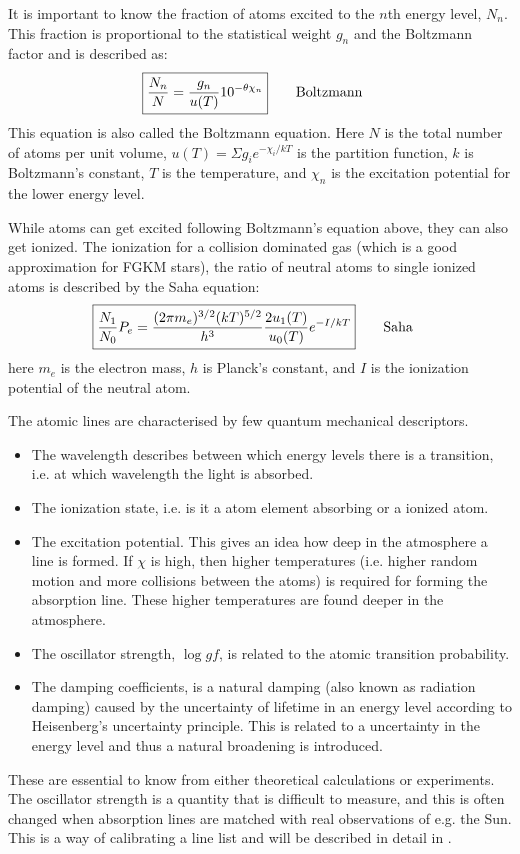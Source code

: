 It is important to know the fraction of atoms excited to the $n$th energy level,
$N_n$. This fraction is proportional to the statistical weight $g_n$ and the
Boltzmann factor and is described as:
\begin{align}
    \Aboxed{ \frac{N_n}{N} = \frac{g_n}{u(T)} 10^{-\theta\chi_n}} \tag*{Boltzmann}
\end{align}
This equation is also called the Boltzmann equation. Here $N$ is the total
number of atoms per unit volume, $u(T)=\Sigma g_i e^{-\chi_i/kT}$ is the
partition function, $k$ is Boltzmann's constant, $T$ is the temperature, and
$\chi_n$ is the excitation potential for the lower energy level.

While atoms can get excited following Boltzmann's equation above, they can also
get ionized. The ionization for a collision dominated gas (which is a good
approximation for FGKM stars), the ratio of neutral atoms to single ionized
atoms is described by the Saha equation:
\begin{align}
  \Aboxed{ \frac{N_1}{N_0}P_e = \frac{(2\pi m_e)^{3/2}(kT)^{5/2}}{h^3} \frac{2u_1(T)}{u_0(T)} e^{-I/kT}} \tag*{Saha}
\end{align}
here $m_e$ is the electron mass, $h$ is Planck's constant, and $I$ is the
ionization potential of the neutral atom.

The atomic lines are characterised by few quantum mechanical descriptors.
\begin{itemize}
  \item The wavelength describes between which energy levels there is a
        transition, i.e. at which wavelength the light is absorbed.
  \item The ionization state, i.e. is it a atom element absorbing or a ionized
        atom.
  \item The excitation potential. This gives an idea how deep in the atmosphere
        a line is formed. If $\chi$ is high, then higher temperatures (i.e.
        higher random motion and more collisions between the atoms) is required
        for forming the absorption line. These higher temperatures are found
        deeper in the atmosphere.
  \item The oscillator strength, $\log \mathit{gf}$, is related to the atomic
        transition probability.
  \item The damping coefficients, is a natural damping (also known as radiation
        damping) caused by the uncertainty of lifetime in an energy level
        according to Heisenberg's uncertainty principle. This is related to a
        uncertainty in the energy level and thus a natural broadening is
        introduced.
\end{itemize}
These are essential to know from either theoretical calculations or experiments.
The oscillator strength is a quantity that is difficult to measure, and this
is often changed when absorption lines are matched with real observations of
e.g. the Sun. This is a way of calibrating a line list and will be described in
detail in .

